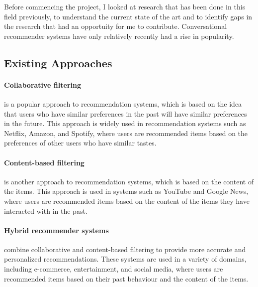 

Before commencing the project, I looked at research that has been done in this field previously, 
to understand the current state of the art and to identify gaps in the research that had an opportuity for me to contribute.
Conversational recommender systems have only relatively recently had a rise in popularity.

\subsection{Existing Approaches}
\paragraph{Collaborative filtering} is a popular approach to recommendation systems, which is based on the idea that users who have similar preferences in the past will have similar preferences in the future.
This approach is widely used in recommendation systems such as Netflix, Amazon, and Spotify, where users are recommended items based on the preferences of other users who have similar tastes.

\paragraph{Content-based filtering} is another approach to recommendation systems, which is based on the content of the items. 
This approach is used in systems such as YouTube and Google News, where users are recommended items based on the content of the items they have interacted with in the past.

\paragraph{Hybrid recommender systems} combine collaborative and content-based filtering to provide more accurate and personalized recommendations.
These systems are used in a variety of domains, including e-commerce, entertainment, and social media, where users are recommended items based on their past behaviour and the content of the items.




